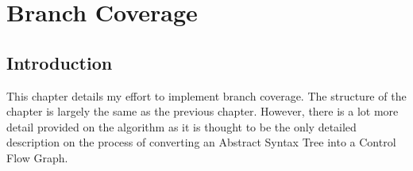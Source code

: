 \chapter{Branch Coverage}

\section{Introduction}
This chapter details my effort to implement branch coverage. The structure of the chapter is largely the same as the previous chapter. However, there is a lot more detail provided on the algorithm as it is thought to be the only detailed description on the process of converting an Abstract Syntax Tree into a Control Flow Graph.





